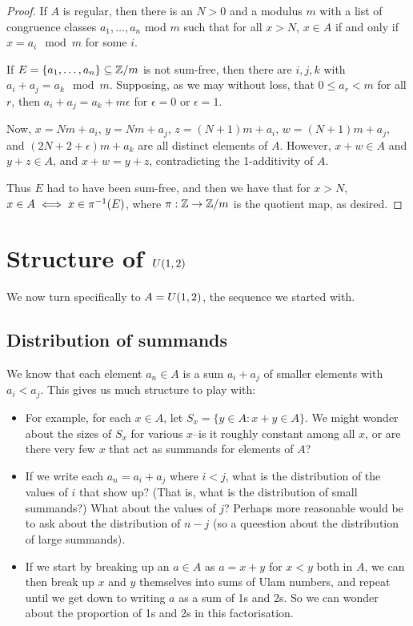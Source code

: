 \documentclass{report}
\theoremstyle{remark}
\numberwithin{equation}{section}
\begin{document}
\begin{proof}
  If $A$ is regular, then there is an $N > 0$ and a modulus $m$ with a
  list of congruence classes $a_1, \ldots, a_n$ mod $m$ such that for
  all $x > N$, $x \in A$ if and only if $x = a_i \mod{m}$ for some
  $i$.  

  If $E = \{a_1, \ldots, a_n\} \subseteq \mathbb{Z}/m$ is not sum-free, then there
  are $i, j, k$ with $a_i + a_j = a_k \mod{m}$.  Supposing, as we may
  without loss, that $0 \leq a_r < m$ for all $r$, then
  $a_i + a_j = a_k + m\epsilon$ for $\epsilon = 0$ or $\epsilon = 1$.

  Now, $x = Nm + a_i$, $y = Nm + a_j$, $z = (N+1)m + a_i$,
  $w = (N+1)m+a_j$, and $(2N+2+\epsilon)m + a_k$ are all distinct
  elements of $A$.  However, $x+w \in A$ and $y+z \in A$, and
  $x + w = y + z$, contradicting the 1-additivity of $A$.

  Thus $E$ had to have been sum-free, and then we have that for
  $x > N$, $x \in A \iff x \in \pi^{-1}(E)$, where $\pi : \mathbb{Z} \to \mathbb{Z}/m$
  is the quotient map, as desired.
\end{proof}

\chapter{Structure of $U(1,2)$}

We now turn specifically to $A = U(1,2)$, the sequence we started
with.  

\section{Distribution of summands}

We know that each element $a_n \in A$ is a sum $a_i + a_j$ of smaller elements
with $a_i < a_j$.  This gives us much structure to play with: 
\begin{itemize}
\item For example, for each $x \in A$, let
  $S_x = \{y \in A : x + y \in A\}$.  We might wonder about the sizes
  of $S_x$ for various $x$--is it roughly constant among all $x$, or
  are there very few $x$ that act as summands for elements of $A$?
\item If we write each $a_n = a_i + a_j$ where $i < j$, what is the
  distribution of the values of $i$ that show up?  (That is, what is
  the distribution of small summands?)  What about the values of
  $j$?  Perhaps more reasonable would be to ask about the distribution
  of $n-j$ (so a queestion about the distribution of large summands).
\item If we start by breaking up an $a \in A$ as $a = x+y$ for $x < y$
  both in $A$, we can then break up $x$ and $y$ themselves into sums
  of Ulam numbers, and repeat until we get down to writing $a$ as a
  sum of 1s and 2s.  So we can wonder about the proportion of 1s and
  2s in this factorisation.  
\end{itemize}
\end{document}
